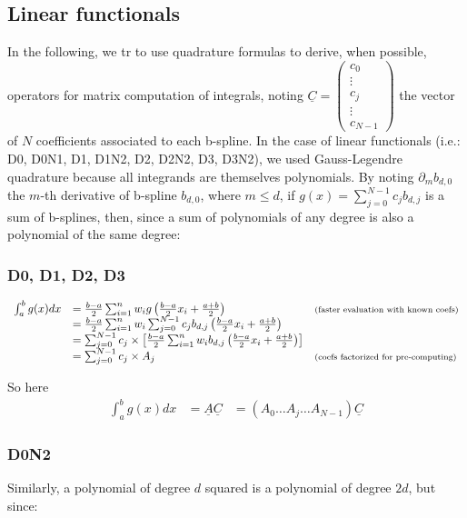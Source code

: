 \documentclass[paper=a4, fontsize=11pt]{scrartcl}
\numberwithin{equation}{section}		%
\numberwithin{figure}{section}			%
\numberwithin{table}{section}				%
\begin{document}
\subsection{Linear functionals}


In the following, we tr to use quadrature formulas to derive, when possible, operators for matrix computation of integrals, noting $\underline{C}=\left(\begin{array}{l}c_0\\ \vdots \\ c_j \\ \vdots \\ c_{N-1}\end{array}\right)$ the vector of $N$ coefficients associated to each b-spline.
In the case of linear functionals (i.e.: D0, D0N1, D1, D1N2, D2, D2N2, D3, D3N2), we used Gauss-Legendre quadrature because all integrands are themselves polynomials.
By noting $\partial_m b_{d,0}$ the $m$-th derivative of b-spline $b_{d,0}$, where $m\leq d$, if $g(x)=\sum_{j=0}^{N-1} c_jb_{d,j}$ is a sum of b-splines, then, since a sum of polynomials of any degree is also a polynomial of the same degree:


\subsubsection{D0, D1, D2, D3}
$$
\begin{array}{lll}
\int_a^b g(x)dx & = \frac{b-a}{2}\sum_{i=1}^n w_ig\left(\frac{b-a}{2}x_i + \frac{a+b}{2}\right) & \text{\scriptsize (faster evaluation with known coefs)}\\
& = \frac{b-a}{2}\sum_{i=1}^n w_i \sum_{j=0}^{N-1} c_jb_{d,j}\left(\frac{b-a}{2}x_i + \frac{a+b}{2}\right) & \\
& = \sum_{j=0}^{N-1} c_j \times \left[ \frac{b-a}{2}\sum_{i=1}^n w_ib_{d,j}\left(\frac{b-a}{2}x_i + \frac{a+b}{2}\right) \right]& \\
& = \sum_{j=0}^{N-1} c_j \times A_j& \text{\scriptsize (coefs factorized for pre-computing)}
\end{array}
$$

So here
$$
\begin{array}{lll}
\int_a^b g(x)dx & = \underline{A}\underline{C} & = \left( A_0 \hdots A_j \hdots A_{N-1} \right)\underline{C}
\end{array}
$$

\subsubsection{D0N2}
Similarly, a polynomial of degree $d$ squared is a polynomial of degree $2d$, but since:
\end{document}
